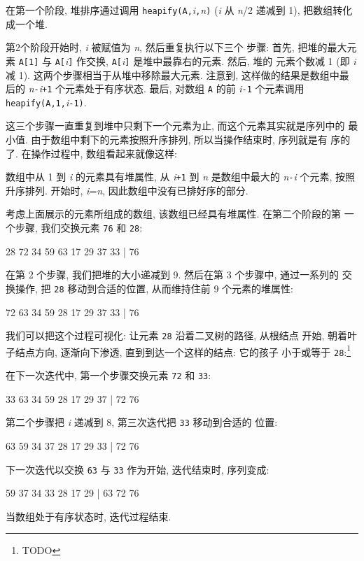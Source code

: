 在第一个阶段, 堆排序通过调用
\texttt{heapify(A,}\textit{i}\texttt{,}\textit{n}\texttt{)} (\textit{i} 从
\textit{n}/2 递减到 1), 把数组转化成一个堆.

第2个阶段开始时, \textit{i} 被赋值为 \textit{n}, 然后重复执行以下三个
步骤: 首先, 把堆的最大元素 \texttt{A[1]} 与 \texttt{A[}\textit{i}\texttt{]}
作交换, \texttt{A[}\textit{i}\texttt{]} 是堆中最靠右的元素. 然后, 堆的 
元素个数减 1 (即 \textit{i} 减 1). 这两个步骤相当于从堆中移除最大元素.
注意到, 这样做的结果是数组中最后的
\textit{n}\texttt{-}\textit{i}\texttt{+1} 个元素处于有序状态. 最后,
对数组 \texttt{A} 的前 \textit{i}\texttt{-1} 个元素调用
\texttt{heapify(A,1,}\textit{i}\texttt{-1)}.

这三个步骤一直重复到堆中只剩下一个元素为止, 而这个元素其实就是序列中的
最小值. 由于数组中剩下的元素按照升序排列, 所以当操作结束时, 序列就是有
序的了. 在操作过程中, 数组看起来就像这样:
\begin{center}
\end{center}
数组中从 1 到 \textit{i} 的元素具有堆属性, 从 \textit{i}\texttt{+1} 到 
\textit{n} 是数组中最大的 \textit{n}\texttt{-}\textit{i} 个元素,
按照升序排列.
开始时, \textit{i}=\textit{n}, 因此数组中没有已排好序的部分.

考虑上面展示的元素所组成的数组, 该数组已经具有堆属性. 在第二个阶段的第
一个步骤, 我们交换元素 \texttt{76} 和 \texttt{28}:
\begin{file}
    28 72 34 59 63 17 29 37 33 | 76
\end{file}
在第 2 个步骤, 我们把堆的大小递减到 9. 然后在第 3 个步骤中, 通过一系列的
交换操作, 把 \texttt{28} 移动到合适的位置, 从而维持住前 9 个元素的堆属性:
\begin{file}
    72 63 34 59 28 17 29 37 33 | 76
\end{file}
我们可以把这个过程可视化: 让元素 \texttt{28} 沿着二叉树的路径, 从根结点
开始, 朝着叶子结点方向, 逐渐向下渗透, 直到到达一个这样的结点: 它的孩子 
小于或等于 \texttt{28}:\footnote{TODO}

在下一次迭代中, 第一个步骤交换元素 \texttt{72} 和 \texttt{33}:
\begin{file}
    33 63 34 59 28 17 29 37 | 72 76
\end{file}
第二个步骤把 \textit{i} 递减到 8, 第三次迭代把 \texttt{33} 移动到合适的 
位置:
\begin{file}
    63 59 34 37 28 17 29 33 | 72 76
\end{file}
下一次迭代以交换 \verb'63' 与 \verb'33' 作为开始, 迭代结束时, 序列变成:
\begin{file}
    59 37 34 33 28 17 29 | 63 72 76
\end{file}
当数组处于有序状态时, 迭代过程结束.

